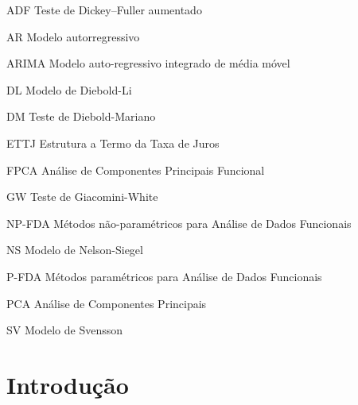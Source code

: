 \documentclass[
	12pt,				%
	openright,			%
	oneside,			%
	a4paper,			%
	english,			%
	brazil				%
	]{dissertacao-ufrgs-abntex2}
\begin{document}
\begin{siglas}
  \item[ADF] Teste de Dickey–Fuller aumentado
  \item[AR] Modelo autorregressivo
  \item[ARIMA] Modelo auto-regressivo integrado de média móvel
  \item[DL] Modelo de Diebold-Li
  \item[DM] Teste de Diebold-Mariano
  \item[ETTJ] Estrutura a Termo da Taxa de Juros
  \item[FPCA] Análise de Componentes Principais Funcional
  \item[GW] Teste de Giacomini-White
  \item[NP-FDA] Métodos não-paramétricos para Análise de Dados Funcionais
  \item[NS] Modelo de Nelson-Siegel
  \item[P-FDA] Métodos paramétricos para Análise de Dados Funcionais
  \item[PCA] Análise de Componentes Principais
  \item[SV] Modelo de Svensson
\end{siglas}



\setcounter{tocdepth}{2}
\tableofcontents*
\cleardoublepage



\textual

\chapter*[Introdução]{Introdução}
\end{document}
